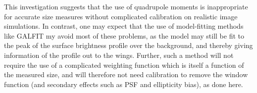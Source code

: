 \documentclass[useAMS,usenatbib,times,letter,amssymb]{mn2e}
\begin{document}
This investigation suggests that the use of quadrupole moments is inappropriate for accurate size measures without complicated calibration on realistic image simulations. In contrast, one may expect that the use of model-fitting methods like GALFIT my avoid most of these problems, as the model may still be fit to the peak of the surface brightness profile over the background, and thereby giving information of the profile out to the wings. Further, such a method will not require the use of a complicated weighting function which is itself a function of the measured size, and will therefore not need calibration to remove the window function (and secondary effects such as PSF and ellipticity bias), as done here.


\bsp

\label{lastpage}
\end{document}
